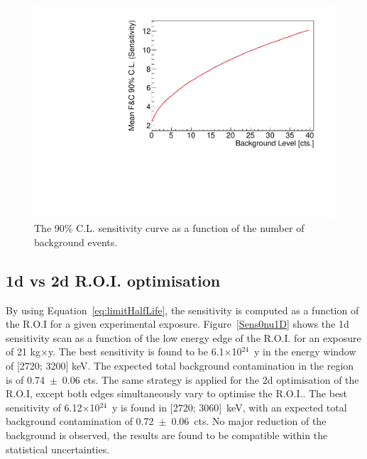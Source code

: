 \documentclass[main.tex]{subfiles}
\begin{document}
\begin{figure}[h!]
\centering
\includegraphics[scale=0.45]{pictures/Chap4/FeldmanCousin.pdf}
\caption{The 90\% C.L. sensitivity curve as a function of the number of background events.}
\label{FeldmanAndCousin}
\end{figure}


\FloatBarrier


\subsection{1d vs 2d R.O.I. optimisation}


\NI By using Equation~\ref{eq:limitHalfLife}, the sensitivity is computed as a function of the R.O.I for a given experimental exposure. Figure~\ref{Sens0nu1D} shows the 1d sensitivity scan as a function of the low energy edge of the R.O.I. for an exposure of 21 kg$\times$y.  The best sensitivity is found to be 6.1$\times$10$^{\text{24}}$~y in the energy window of [2720; 3200] keV. The expected total background contamination in the region is of 0.74~$\pm$~0.06 cts. The same strategy is applied for the 2d optimisation of the R.O.I, except both edges simultaneously vary to optimise the R.O.I.. The best sensitivity of 6.12$\times$10$^{\text{24}}$~y is found in [2720; 3060]~keV, with an expected total background contamination of 0.72~$\pm$~0.06~cts. No major reduction of the background is observed, the results are found to be compatible within the statistical uncertainties. 
\end{document}
